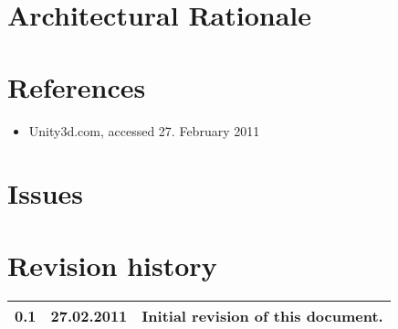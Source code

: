 \documentclass[titlepage,a4paper,11pt]{article}
\begin{document}
\section{Architectural Rationale}



\section{References}
\begin{itemize}
  \item Unity3d.com, accessed 27. February 2011
\end{itemize}

\section{Issues}
\section{Revision history}

\begin{table}[H]
  \begin{tabular}{| c | c | c |}
    \hline
    0.1 & 27.02.2011 & Initial revision of this document. \\
    \hline
  \end{tabular}
\end{table}
\end{document}
